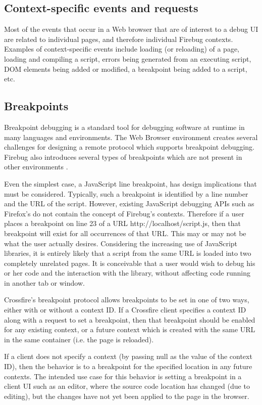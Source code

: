 \subsection {Context-specific events and requests}
Most of the events that occur in a Web browser that are of interest to a debug
UI are related to individual pages, and therefore individual Firebug contexts.
Examples of context-specific events include loading (or reloading) of a page,
loading and compiling a script, errors being generated from an executing script,
DOM elements being added or modified, a breakpoint being added to a script, etc.

\subsection {Breakpoints}
Breakpoint debugging is a standard tool for debugging software at runtime in
many languages and environments. The Web Browser environment creates several
challenges for designing a remote protocol which supports breakpoint debugging.
Firebug also introduces several types of breakpoints which are not present in
other environments \cite{jjb-www2010}.

Even the simplest case, a JavaScript line breakpoint, has design implications
that must be considered. Typically, such a breakpoint is identified by a line
number and the URL of the script. However, existing JavaScript debugging APIs
such as Firefox's do not contain the concept of Firebug's contexts.  Therefore
if a user places a breakpoint on line 23 of a URL http://localhost/script.js,
then that breakpoint will exist for all occurrences of that URL. This may or may
not be what the user actually desires.  Considering the increasing use of
JavaScript libraries, it is entirely likely that a script from the same URL is
loaded into two completely unrelated pages. It is conceivable that a user would
wish to debug his or her code and the interaction with the library, without
affecting code running in another tab or window.

Crossfire's breakpoint protocol allows breakpoints to be set in one of two ways,
either with or without a context ID. If a Crossfire client specifies a context
ID along with a request to set a breakpoint, then that breakpoint should be
enabled for any existing context, or a future context which is created with the
same URL in the same container (i.e. the page is reloaded).

If a client does not specify a context (by passing null as the value of the
context ID), then the behavior is to a breakpoint for the specified location in
any future contexts. The intended use case for this behavior is setting a
breakpoint in a client UI such as an editor, where the source code location has
changed (due to editing), but the changes have not yet been applied to the page
in the browser.

